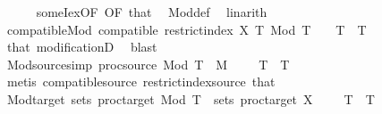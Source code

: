 \begin{isabellebody}
\ \ \ \ \isamarkupfalse%
\ someI{\isacharunderscore}{\kern0pt}ex{\isacharbrackleft}{\kern0pt}OF\ {\isacharasterisk}{\kern0pt}{\isacharbrackleft}{\kern0pt}OF\ that{\isacharbrackright}{\kern0pt}{\isacharbrackright}{\kern0pt}\ \isamarkupfalse%
\ Mod{\isacharunderscore}{\kern0pt}def\ \isamarkupfalse%
\ linarith{\isacharplus}{\kern0pt}\isanewline
\ \ \isamarkupfalse%
\ \isamarkupfalse%
\ compatible{\isacharunderscore}{\kern0pt}Mod{\isacharcolon}{\kern0pt}\ {\isachardoublequoteopen}compatible\ {\isacharparenleft}{\kern0pt}restrict{\isacharunderscore}{\kern0pt}index\ X\ {\isacharbraceleft}{\kern0pt}{}{\isachardot}{\kern0pt}{\isachardot}{\kern0pt}T{\isacharbraceright}{\kern0pt}{\isacharparenright}{\kern0pt}\ {\isacharparenleft}{\kern0pt}Mod\ T{\isacharparenright}{\kern0pt}{\isachardoublequoteclose}\ \ {\isachardoublequoteopen}{}\ {\isacharless}{\kern0pt}\ T{\isachardoublequoteclose}\ \ T\isanewline
\ \ \ \ \isamarkupfalse%
\ that\ modificationD{\isacharparenleft}{\kern0pt}{}{\isacharparenright}{\kern0pt}\ \isamarkupfalse%
\ blast\isanewline
\ \ \isamarkupfalse%
\ \isamarkupfalse%
\ Mod{\isacharunderscore}{\kern0pt}source{\isacharbrackleft}{\kern0pt}simp{\isacharbrackright}{\kern0pt}{\isacharcolon}{\kern0pt}\ {\isachardoublequoteopen}proc{\isacharunderscore}{\kern0pt}source\ {\isacharparenleft}{\kern0pt}Mod\ T{\isacharparenright}{\kern0pt}\ {\isacharequal}{\kern0pt}\ {\isacharquery}{\kern0pt}M{\isachardoublequoteclose}\ \ \ {\isachardoublequoteopen}{}\ {\isacharless}{\kern0pt}\ T{\isachardoublequoteclose}\ \ T\isanewline
\ \ \ \ \isamarkupfalse%
\ {\isacharparenleft}{\kern0pt}metis\ compatible{\isacharunderscore}{\kern0pt}source\ restrict{\isacharunderscore}{\kern0pt}index{\isacharunderscore}{\kern0pt}source\ that{\isacharparenright}{\kern0pt}\isanewline
\ \ \isamarkupfalse%
\ Mod{\isacharunderscore}{\kern0pt}target{\isacharcolon}{\kern0pt}\ {\isachardoublequoteopen}sets\ {\isacharparenleft}{\kern0pt}proc{\isacharunderscore}{\kern0pt}target\ {\isacharparenleft}{\kern0pt}Mod\ T{\isacharparenright}{\kern0pt}{\isacharparenright}{\kern0pt}\ {\isacharequal}{\kern0pt}\ sets\ {\isacharparenleft}{\kern0pt}proc{\isacharunderscore}{\kern0pt}target\ X{\isacharparenright}{\kern0pt}{\isachardoublequoteclose}\ \ \ {\isachardoublequoteopen}{}\ {\isacharless}{\kern0pt}\ T{\isachardoublequoteclose}\ \ T\isanewline

\end{isabellebody}
